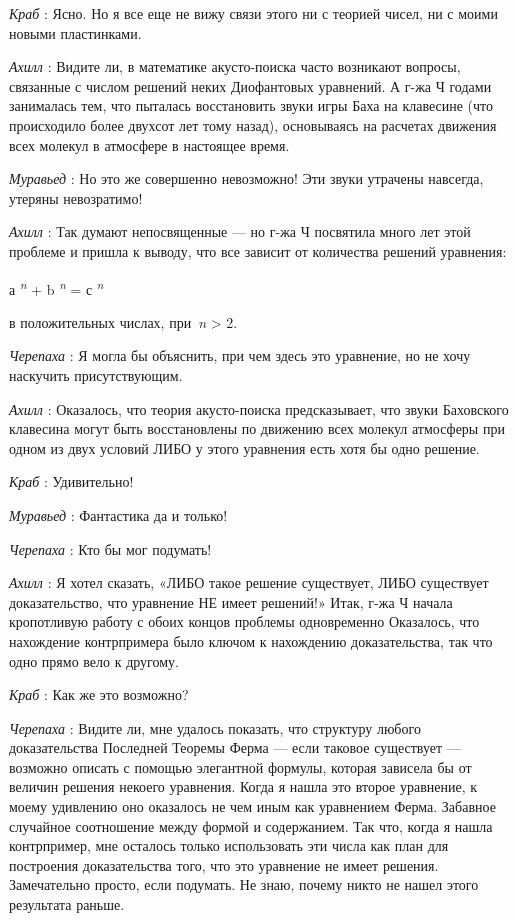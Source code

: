 \emph{Краб} : Ясно. Но я все еще не вижу связи этого ни с теорией чисел, ни с моими новыми пластинками.

\emph{Ахилл} : Видите ли, в математике акусто-поиска часто возникают вопросы, связанные с числом решений неких Диофантовых уравнений. А г-жа Ч годами занималась тем, что пыталась восстановить звуки игры Баха на клавесине (что происходило более двухсот лет тому назад), основываясь на расчетах движения всех молекул в атмосфере в настоящее время.

\emph{Муравьед} : Но это же совершенно невозможно! Эти звуки утрачены навсегда, утеряны невозратимо!

\emph{Ахилл} : Так думают непосвященные --- но г-жа Ч посвятила много лет этой проблеме и пришла к выводу, что все зависит от количества решений уравнения:

а \textsuperscript{\emph{n}} + b \textsuperscript{\emph{n}} = с \textsuperscript{\emph{n}}

в положительных числах, при~\emph{n} \textgreater{} 2.

\emph{Черепаха} : Я могла бы объяснить, при чем здесь это уравнение, но не хочу наскучить присутствующим.

\emph{Ахилл} : Оказалось, что теория акусто-поиска предсказывает, что звуки Баховского клавесина могут быть восстановлены по движению всех молекул атмосферы при одном из двух условий ЛИБО у этого уравнения есть хотя бы одно решение.

\emph{Краб} : Удивительно!

\emph{Муравьед} : Фантастика да и только!

\emph{Черепаха} : Кто бы мог подумать!

\emph{Ахилл} : Я хотел сказать, «ЛИБО такое решение существует, ЛИБО существует доказательство, что уравнение НЕ имеет решений!» Итак, г-жа Ч начала кропотливую работу с обоих концов проблемы одновременно Оказалось, что нахождение контрпримера было ключом к нахождению доказательства, так что одно прямо вело к другому.

\emph{Краб} : Как же это возможно?

\emph{Черепаха} : Видите ли, мне удалось показать, что структуру любого доказательства Последней Теоремы Ферма --- если таковое существует --- возможно описать с помощью элегантной формулы, которая зависела бы от величин решения некоего уравнения. Когда я нашла это второе уравнение, к моему удивлению оно оказалось не чем иным как уравнением Ферма. Забавное случайное соотношение между формой и содержанием. Так что, когда я нашла контрпример, мне осталось только использовать эти числа как план для построения доказательства того, что это уравнение не имеет решения. Замечательно просто, если подумать. Не знаю, почему никто не нашел этого результата раньше.

